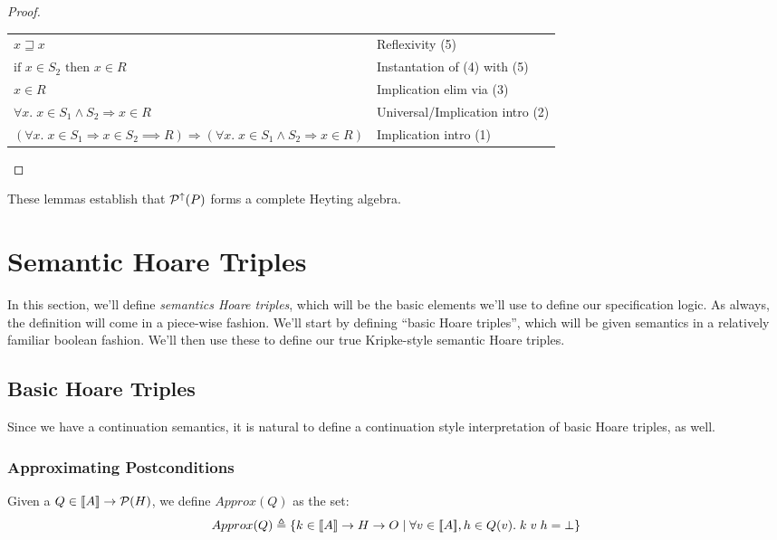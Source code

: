 \begin{proof}
\begin{tabular}{ll}
$x \sqsupseteq x$ & 
Reflexivity (5) \\

$\mbox{if } x \in S_2 \mbox{ then } x \in R$ & 
Instantation of (4) with (5) \\

$x \in R$ & 
Implication elim via (3) \\

$\forall x.\; x \in S_1 \land S_2 \Rightarrow x \in R$ & 
Universal/Implication intro (2) \\

$(\forall x.\; x \in S_1 \Rightarrow x \in S_2 \implies R) \Rightarrow (\forall x.\; x \in S_1 \land S_2 \Rightarrow x \in R)$ & 
Implication intro (1) \\
\end{tabular}
\end{proof}

These lemmas establish that $\mathcal{P}^{\uparrow}({P})$ forms a complete Heyting algebra. 

\section{Semantic Hoare Triples}

In this section, we'll define \emph{semantics Hoare triples}, which will be the basic
elements we'll use to define our specification logic. As always, the definition
will come in a piece-wise fashion. We'll start by defining ``basic Hoare triples'',
which will be given semantics in a relatively familiar boolean fashion. We'll then
use these to define our true Kripke-style semantic Hoare triples. 

\subsection{Basic Hoare Triples}

Since we have a continuation semantics, it is natural to define a
continuation style interpretation of basic Hoare triples, as well.

\subsubsection{Approximating Postconditions}

Given a $Q \in [\![{A}]\!] \to \mathcal{P}(H)$, we define $Approx(Q)$ as the set:
\begin{displaymath}
  Approx(Q) \triangleq \{{{k \in [\![{A}]\!] \to H \to O}\;|\;{\forall v \in [\![{A}]\!], h \in Q(v).\; k\;v\;h = \bot}}\}
\end{displaymath}

